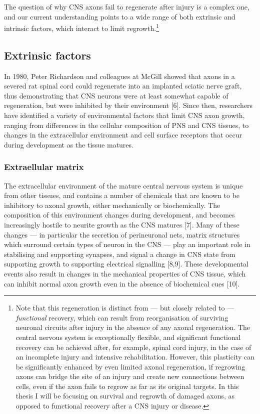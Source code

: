 \documentclass[
  12pt,
  a4paper,
]{book}
\begin{document}
The question of why CNS axons fail to regenerate after injury is a complex one, and our current understanding points to a wide range of both extrinsic and intrinsic factors, which interact to limit regrowth.\footnote{Note that this regeneration is distinct from --- but closely related to --- \emph{functional} recovery, which can result from reorganisation of surviving neuronal circuits after injury in the absence of any axonal regeneration. The central nervous system is exceptionally flexible, and significant functional recovery can be achieved after, for example, spinal cord injury, in the case of an incomplete injury and intensive rehabilitation. However, this plasticity can be significantly enhanced by even limited axonal regeneration, if regrowing axons can bridge the site of an injury and create new connections between cells, even if the axon fails to regrow as far as its original targets. In this thesis I will be focusing on survival and regrowth of damaged axons, as opposed to functional recovery after a CNS injury or disease.}

\subsection{Extrinsic factors}\label{extrinsic-factors}

In 1980, Peter Richardson and colleagues at McGill showed that axons in a severed rat spinal cord could regenerate into an implanted sciatic nerve graft, thus demonstrating that CNS neurons were at least somewhat capable of regeneration, but were inhibited by their environment {[}6{]}. Since then, researchers have identified a variety of environmental factors that limit CNS axon growth, ranging from differences in the cellular composition of PNS and CNS tissues, to changes in the extracellular environment and cell surface receptors that occur during development as the tissue matures.

\subsubsection{Extraellular matrix}\label{extraellular-matrix}

The extracellular environment of the mature central nervous system is unique from other tissues, and contains a number of chemicals that are known to be inhibitory to axonal growth, either mechanically or biochemically. The composition of this environment changes during development, and becomes increasingly hostile to neurite growth as the CNS matures {[}7{]}. Many of these changes --- in particular the secretion of perineuronal nets, matrix structures which surround certain types of neuron in the CNS --- play an important role in stabilising and supporting synapses, and signal a change in CNS state from supporting growth to supporting electrical signalling {[}8,9{]}. These developmental events also result in changes in the mechanical properties of CNS tissue, which can inhibit normal axon growth even in the absence of biochemical cues {[}10{]}.
\end{document}
